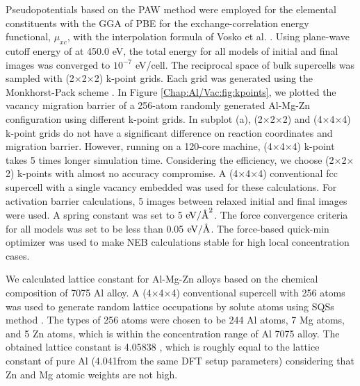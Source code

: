 Pseudopotentials based on the \ac{PAW} method were employed for the elemental constituents with the \ac{GGA} of \ac{PBE} for the exchange-correlation energy functional, $\mu_{xc}$, with the interpolation formula of Vosko et al. \cite{vosko1980accurate}. Using plane-wave cutoff energy of at 450.0 eV, the total energy for all models of initial and final images was converged to $10^{−7}$ eV/cell. The reciprocal space of bulk supercells was sampled with (2$\times$2$\times$2) k-point grids. Each grid was generated using the Monkhorst-Pack scheme \cite{monkhorst1976special}. In Figure \ref{Chap:Al/Vac:fig:kpoints}, we plotted the vacancy migration barrier of a 256-atom randomly generated Al-Mg-Zn configuration using different k-point grids. In subplot (a), (2$\times$2$\times$2) and (4$\times$4$\times$4) k-point grids do not have a significant difference on reaction coordinates and migration barrier. However, running on a 120-core machine, (4$\times$4$\times$4) k-point takes 5 times longer simulation time. Considering the efficiency, we choose (2$\times$2$\times$2) k-points with almost no accuracy compromise. A (4$\times$4$\times$4) conventional fcc supercell with a single vacancy embedded was used for these calculations. For activation barrier calculations, 5 images between relaxed initial and final images were used. A spring constant was set to 5 $\text{eV}/\mbox{\normalfont\AA}^2$. The force convergence criteria for all models was set to be less than 0.05 $\text{eV}/\mbox{\normalfont\AA}$. The force-based quick-min optimizer was used to make \ac{NEB} calculations stable for high local concentration cases\cite{sheppard2008optimization}.


We calculated lattice constant for Al-Mg-Zn alloys based on the chemical composition of  7075 Al alloy. A (4$\times$4$\times$4) conventional supercell with 256 atoms was used to generate random lattice occupations by solute atoms using \acfp{SQS} method \cite{zunger1990special}. The types of 256 atoms were chosen to be 244 Al atoms, 7 Mg atoms, and 5 Zn atoms, which is within the concentration range of Al 7075 alloy. The obtained lattice constant is 4.05838 \angstrom, which is roughly equal to the lattice constant of pure Al (4.041\angstrom from the same DFT setup parameters) considering that Zn and Mg atomic weights are not high\cite{haas2009calculation}.



